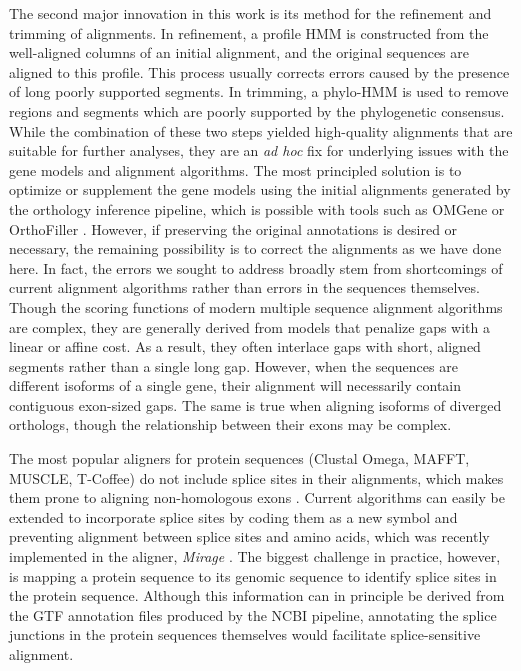 \documentclass[10pt,letterpaper]{article}
\begin{document}
The second major innovation in this work is its method for the refinement and trimming of alignments. In refinement, a profile HMM is constructed from the well-aligned columns of an initial alignment, and the original sequences are aligned to this profile. This process usually corrects errors caused by the presence of long poorly supported segments. In trimming, a phylo-HMM is used to remove regions and segments which are poorly supported by the phylogenetic consensus. While the combination of these two steps yielded high-quality alignments that are suitable for further analyses, they are an \textit{ad hoc} fix for underlying issues with the gene models and alignment algorithms. The most principled solution is to optimize or supplement the gene models using the initial alignments generated by the orthology inference pipeline, which is possible with tools such as OMGene or OrthoFiller \cite{Dunne2018, Dunne2017}. However, if preserving the original annotations is desired or necessary, the remaining possibility is to correct the alignments as we have done here. In fact, the errors we sought to address broadly stem from shortcomings of current alignment algorithms rather than errors in the sequences themselves. Though the scoring functions of modern multiple sequence alignment algorithms are complex, they are generally derived from models that penalize gaps with a linear or affine cost. As a result, they often interlace gaps with short, aligned segments rather than a single long gap. However, when the sequences are different isoforms of a single gene, their alignment will necessarily contain contiguous exon-sized gaps. The same is true when aligning isoforms of diverged orthologs, though the relationship between their exons may be complex.

The most popular aligners for protein sequences (Clustal Omega, MAFFT, MUSCLE, T-Coffee) do not include splice sites in their alignments, which makes them prone to aligning non-homologous exons \cite{Sievers2017, Katoh2013, Edgar2004, Notredame2000}. Current algorithms can easily be extended to incorporate splice sites by coding them as a new symbol and preventing alignment between splice sites and amino acids, which was recently implemented in the aligner, \textit{Mirage} \cite{Nord2018}. The biggest challenge in practice, however, is mapping a protein sequence to its genomic sequence to identify splice sites in the protein sequence. Although this information can in principle be derived from the GTF annotation files produced by the NCBI pipeline, annotating the splice junctions in the protein sequences themselves would facilitate splice-sensitive alignment.
\end{document}

